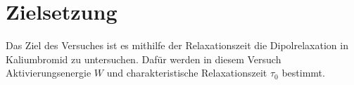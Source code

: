 \section{Zielsetzung}
\label{sec:zielsetzung}
Das Ziel des Versuches ist es mithilfe der Relaxationszeit die Dipolrelaxation in Kaliumbromid zu untersuchen. Dafür werden in diesem Versuch Aktivierungsenergie $W$ und charakteristische Relaxationszeit $\tau_\mathrm{0}$ bestimmt.
